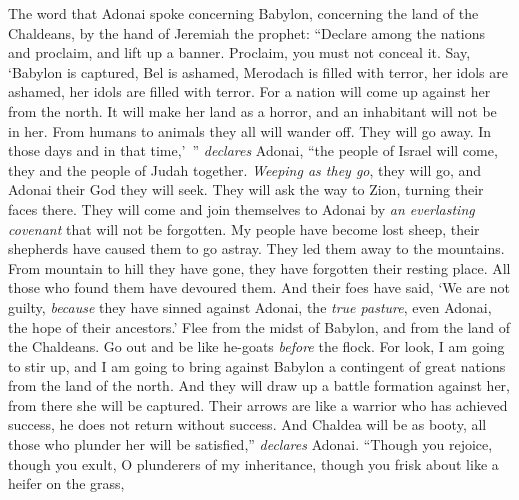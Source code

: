 \begin{biblechapter} %
 The word that Adonai spoke concerning Babylon, concerning the land of the Chaldeans, by the hand of Jeremiah the prophet:
\verse “Declare among the nations and proclaim, 
and lift up a banner. 
Proclaim, you must not conceal it. 
Say, ‘Babylon is captured, 
Bel is ashamed, 
Merodach is filled with terror, 
her idols are ashamed, 
her idols are filled with terror.
\verse For a nation will come up against her from the north. 
It will make her land as a horror, 
and an inhabitant will not be in her. 
From humans to animals they all will wander off. 
They will go away.
\verse In those days and in that time,’ ” \textit{declares} Adonai, 
“the people of Israel will come, 
they and the people of Judah together. 
\textit{Weeping as they go}, they will go, 
and Adonai their God they will seek.
\verse They will ask the way to Zion, 
turning their faces there. 
They will come and join themselves to Adonai 
by \textit{an everlasting covenant} that will not be forgotten.
\verse My people have become lost sheep, 
their shepherds have caused them to go astray. 
They led them away to the mountains. 
From mountain to hill they have gone, 
they have forgotten their resting place.
\verse All those who found them have devoured them. 
And their foes have said, ‘We are not guilty, 
\textit{because} they have sinned against Adonai, the \textit{true pasture}, 
even Adonai, the hope of their ancestors.’
\verse Flee from the midst of Babylon, 
and from the land of the Chaldeans. 
Go out and be like he-goats 
\textit{before} the flock.
\verse For look, I am going to stir up, 
and I am going to bring against Babylon 
a contingent of great nations 
from the land of the north. 
And they will draw up a battle formation against her, 
from there she will be captured. 
Their arrows are like a warrior who has achieved success, 
he does not return without success.
\verse And Chaldea will be as booty, 
all those who plunder her will be satisfied,” \textit{declares} Adonai.
\verse “Though you rejoice, though you exult, 
O plunderers of my inheritance, 
though you frisk about like a heifer on the grass, 

\end{biblechapter}
